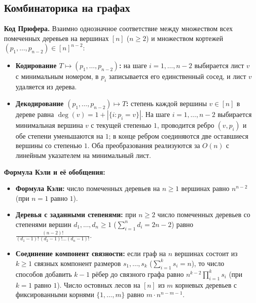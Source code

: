 \documentclass[10pt,a4paper]{article}
\renewcommand{\ge}{\geqslant}
\begin{document}
\subsection{Комбинаторика на графах}

\textbf{Код Прюфера.} Взаимно однозначное соответствие между множеством всех помеченных деревьев на вершинах $[n]$ ($n \ge 2$) и множеством кортежей $(p_1, \dots, p_{n - 2}) \in [n]^{n - 2}$:
\begin{itemize}
  \item \textbf{Кодирование $T \mapsto (p_1, \dots, p_{n - 2})$:} на шаге $i = 1, \dots, n - 2$ выбирается лист $v$ с минимальным номером, в $p_i$ записывается его единственный сосед, и лист $v$ удаляется из дерева.
  \item \textbf{Декодирование $(p_1, \dots, p_{n - 2}) \mapsto T$:} степень каждой вершины $v \in [n]$ в дереве равна $\deg(v) = 1 + |\{i : p_i = v\}|$. На шаге $i = 1, \dots, n - 2$ выбирается минимальная вершина $v$ с текущей степенью $1$, проводится ребро $(v, p_i)$ и обе степени уменьшаются на $1$; в конце ребром соединяются две оставшиеся вершины со степенью $1$. Оба преобразования реализуются за $O(n)$ с линейным указателем на минимальный лист.
\end{itemize}

\textbf{Формула Кэли и её обобщения:}
\begin{itemize}
  \item \textbf{Формула Кэли:} число помеченных деревьев на $n \ge 1$ вершинах равно $n^{n - 2}$ (при $n = 1$ равно $1$).
  \item \textbf{Деревья с заданными степенями:} при $n \ge 2$ число помеченных деревьев со степенями вершин $d_1, \dots, d_n \ge 1$ ($\sum_{i=1}^n d_i = 2n - 2$) равно $\frac{(n - 2)!}{(d_1 - 1)!\,(d_2 - 1)!\dots(d_n - 1)!}$.
  \item \textbf{Соединение компонент связности:} если граф на $n$ вершинах состоит из $k \ge 1$ связных компонент размеров $s_1, \dots, s_k$ ($\sum_{i=1}^k s_i = n$), то число способов добавить $k - 1$ рёбер до связного графа равно $n^{k - 2} \prod_{i=1}^k s_i$ (при $k = 1$ равно $1$). Число остовных лесов на $[n]$ из $m$ корневых деревьев с фиксированными корнями $\{1, \dots, m\}$ равно $m \cdot n^{n - m - 1}$.
\end{itemize}
\end{document}
